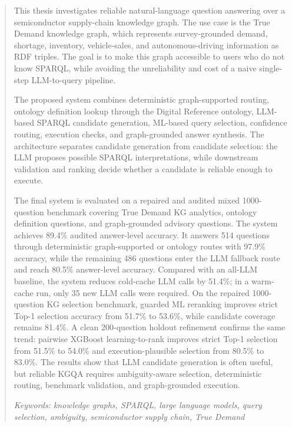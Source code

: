 \documentclass[
  12pt,
  english,
  oneside]{report}
\begin{document}
\clearpage\mbox{}\thispagestyle{empty}\clearpage
\renewcommand{\abstractname}{Abstract}
\begin{abstract}
This thesis investigates reliable natural-language question answering over a semiconductor supply-chain knowledge graph. The use case is the True Demand knowledge graph, which represents survey-grounded demand, shortage, inventory, vehicle-sales, and autonomous-driving information as RDF triples. The goal is to make this graph accessible to users who do not know SPARQL, while avoiding the unreliability and cost of a naive single-step LLM-to-query pipeline.

The proposed system combines deterministic graph-supported routing, ontology definition lookup through the Digital Reference ontology, LLM-based SPARQL candidate generation, ML-based query selection, confidence routing, execution checks, and graph-grounded answer synthesis. The architecture separates candidate generation from candidate selection: the LLM proposes possible SPARQL interpretations, while downstream validation and ranking decide whether a candidate is reliable enough to execute.

The final system is evaluated on a repaired and audited mixed 1000-question benchmark covering True Demand KG analytics, ontology definition questions, and graph-grounded advisory questions. The system achieves 89.4\% audited answer-level accuracy. It answers 514 questions through deterministic graph-supported or ontology routes with 97.9\% accuracy, while the remaining 486 questions enter the LLM fallback route and reach 80.5\% answer-level accuracy. Compared with an all-LLM baseline, the system reduces cold-cache LLM calls by 51.4\%; in a warm-cache run, only 35 new LLM calls were required. On the repaired 1000-question KG selection benchmark, guarded ML reranking improves strict Top-1 selection accuracy from 51.7\% to 53.6\%, while candidate coverage remains 81.4\%. A clean 200-question holdout refinement confirms the same trend: pairwise XGBoost learning-to-rank improves strict Top-1 selection from 51.5\% to 54.0\% and execution-plausible selection from 80.5\% to 83.0\%. The results show that LLM candidate generation is often useful, but reliable KGQA requires ambiguity-aware selection, deterministic routing, benchmark validation, and graph-grounded execution.

\emph{Keywords: knowledge graphs, SPARQL, large language models, query selection, ambiguity, semiconductor supply chain, True Demand}
\end{abstract}
\end{document}
